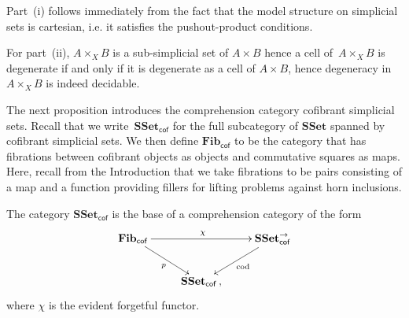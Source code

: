 \documentclass[reqno,10pt,a4paper,oneside]{amsart}
\makeatletter
\renewenvironment{proof}[1][\proofname] {\par\pushQED{\qed}\normalfont\topsep6\p@\@plus6\p@\relax\trivlist\item[\hskip\labelsep\bf#1\@addpunct{.}]\ignorespaces}{\popQED\endtrivlist\@endpefalse}
\numberwithin{equation}{section}
\theoremstyle{mythm}
\theoremstyle{mydef}
\theoremstyle{myrmk}
\newcommand{\co}{\colon}
\newcommand{\SSet}{\mathbf{SSet}}
\makeatother
\begin{document}
\begin{proof} Part~(i) follows immediately from the fact that the model structure on simplicial sets is cartesian, i.e. it satisfies the pushout-product conditions.


For part~(ii), $A \times_X B$ is a sub-simplicial set of $A \times B$ hence a cell of~$A \times_X B$ is degenerate if and only if it is degenerate as a cell of $A \times B$, hence degeneracy
in~$A \times_X B$ is indeed decidable. 
\end{proof}


The next proposition introduces the  comprehension category  cofibrant simplicial sets.
Recall that we write~$\SSet_{\mathsf{cof}}$ for the full subcategory of  $\SSet$ spanned by
cofibrant simplicial sets. We then define $\mathbf{Fib}_{ \mathsf{cof}}$ to be the category that 
has fibrations between cofibrant objects as objects and commutative squares as maps. Here,
recall from the Introduction that we take fibrations to be pairs consisting of a map
and a function providing fillers for lifting problems against horn inclusions. 


\begin{proposition} \label{thm:compcat}
The category $\SSet_{\mathsf{cof}}$ is the base of a comprehension category
of the form
\begin{equation*}
\begin{gathered}
\xymatrix{
\mathbf{Fib}_{ \mathsf{cof}} \ar[dr]_{p} \ar[rr]^{\chi} & & \SSet^{\to}_{\mathsf{cof}} \ar[dl]^{\mathrm{cod}} \\ 
 & \SSet_{\mathsf{cof}} \, , &  }
 \end{gathered}
 \end{equation*}
 where $\chi$ is the evident forgetful functor.
\end{proposition} 
\end{document}
